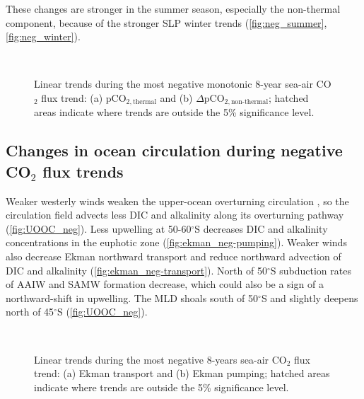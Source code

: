 These changes are stronger in the summer season, especially the non-thermal component, because of the stronger \acs{SLP} winter trends (\autoref{fig:neg_summer}, \ref{fig:neg_winter}). 
 
\begin{figure}[bth]
        \myfloatalign
         \\
        \caption{Linear trends during the most negative monotonic 8-year sea-air CO$_2$ flux trend: (a) pCO$_{2,\text{thermal}}$ and (b) $\Delta$pCO$_{2,\text{non-thermal}}$; hatched areas indicate where trends are outside the 5\% significance level.} \label{fig:thermal_neg}
\end{figure}




\clearpage

\subsection{Changes in ocean circulation during negative CO$_2$ flux trends}
\label{sec:trends_neg_circulation}

Weaker westerly winds weaken the upper-ocean overturning circulation \citep{Lauderdale2013}, so the circulation field advects less \acs{DIC} and alkalinity along its overturning pathway (\autoref{fig:UOOC_neg}). Less upwelling at 50-60$^\circ$S decreases \acs{DIC} and alkalinity concentrations in the euphotic zone (\autoref{fig:ekman_neg-pumping}). Weaker winds also decrease Ekman northward transport and reduce northward advection of \acs{DIC} and alkalinity (\autoref{fig:ekman_neg-transport}). North of 50$^\circ$S subduction rates of \acs{AAIW} and \acs{SAMW} formation decrease, which could also be a sign of a northward-shift in upwelling. The \acs{MLD} shoals south of 50$^\circ$S and slightly deepens north of 45$^\circ$S (\autoref{fig:UOOC_neg}). 


\begin{figure}[hbt]
        \myfloatalign
         \\
        \caption{Linear trends during the most negative 8-years sea-air CO$_2$ flux trend: (a) Ekman transport and (b) Ekman pumping; hatched areas indicate where trends are outside the 5\% significance level.} \label{fig:ekman_neg}
\end{figure}


